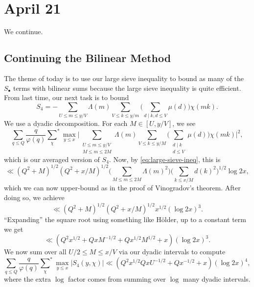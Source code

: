 \documentclass[../notes.tex]{subfiles}
\begin{document}
\section{April 21}

We continue.

\subsection{Continuing the Bilinear Method}
The theme of today is to use our large sieve inequality to bound as many of the $S_\bullet$ terms with bilinear sums because the large sieve inequality is quite efficient. From last time, our next task is to bound
\[S_4 = -\sum_{U\le m\le y/V}\Lambda(m)\sum_{V\le k\le y/m}\Bigg(\sum_{d\mid k,d\le V}\mu(d)\Bigg)\chi(mk).\]
We use a dyadic decomposition. For each $M\in[U,y/V]$, we see
\[\sum_{q\le Q}\frac q{\varphi(q)}{\sum_\chi}^*\max_{y\le x}\Bigg|\sum_{\substack{U\le m\le y/V\\M\le m\le2M}}\Lambda(m)\sum_{V\le k\le y/M}\Bigg(\sum_{\substack{d\mid k\\d\le V}}\mu(d)\Bigg)\chi(mk)\Bigg|^2,\]
which is our averaged version of $S_4$. Now, by \eqref{eq:large-sieve-ineq}, this is
\[\ll\left(Q^2+M\right)^{1/2}\left(Q^2+x/M\right)^{1/2}\Bigg(\sum_{M\le m\le2M}\Lambda(m)^2\Bigg)\Bigg(\sum_{k\le x/M}d(k)^2\Bigg)^{1/2}\log2x,\]
which we can now upper-bound as in the proof of Vinogradov's theorem. After doing so, we achieve
\[\ll\left(Q^2+M\right)^{1/2}\left(Q^2+x/M\right)^{1/2}x^{1/2}(\log2x)^3.\]
``Expanding'' the square root using something like H\"older, up to a constant term we get
\[\ll\left(Q^2x^{1/2}+QxM^{-1/2}+Qx^{1/2}M^{1/2}+x\right)(\log2x)^3.\]
We now sum over all $U/2\le M\le x/V$ via our dyadic intervals to compute
\[\sum_{q\le Q}\frac q{\varphi(q)}{\sum_\chi}^*\max_{y\le x}|S_4(y,\chi)|\ll\left(Q^2x^{1/2}QxU^{-1/2}+Qx^{-1/2}+x\right)(\log2x)^4,\]
where the extra $\log$ factor comes from summing over $\log$ many dyadic intervals.
\end{document}
